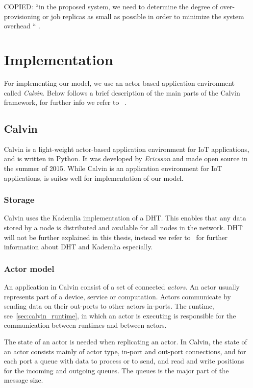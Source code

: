 \documentclass{cslthse-msc}
\begin{document}
COPIED: “in the proposed system, we need to determine the degree of over-provisioning or job replicas as small as possible in order to minimize the system overhead “ \cite{designFaultTolerantSched}.
\fi

\section{Implementation} \label{sec:design_implementation}
For implementing our model, we use an actor based application environment called \emph{Calvin}. Below follows a brief description of the main parts of the Calvin framework, for further info we refer to ~\cite{calvin}.

\subsection{Calvin} \label{subsec:design_calvin}
Calvin is a light-weight actor-based application environment for IoT applications, and is written in Python. It was developed by \emph{Ericsson} and made open source in the summer of 2015. While Calvin is an application environment for IoT applications, is suites well for implementation of our model.

\subsubsection{Storage} \label{sec:calvin_storage}
Calvin uses the Kademlia implementation of a DHT. This enables that any data stored by a node is distributed and available for all nodes in the network. DHT will not be further explained in this thesis, instead we refer to~\cite{kademlia} for further information about DHT and Kademlia especially.

\subsubsection{Actor model}
An application in Calvin consist of a set of connected \emph{actors}. An actor usually represents part of a device, service or computation. Actors communicate by sending data on their out-ports to other actors in-ports. The runtime, see~\cref{sec:calvin_runtime}, in which an actor is executing is responsible for the communication between runtimes and between actors.

The state of an actor is needed when replicating an actor. In Calvin, the state of an actor consists mainly of actor type, in-port and out-port connections, and for each port a queue with data to process or to send, and read and write positions for the incoming and outgoing queues. The queues is the major part of the message size.
\end{document}
